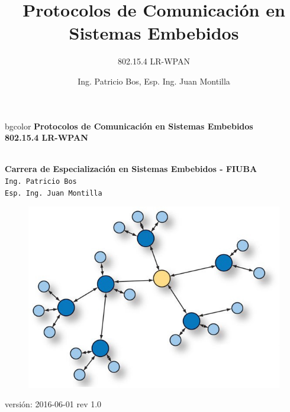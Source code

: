 \documentclass[aspectratio=169, handout]{beamer}
\title[802.15.4 LR-WPAN]{Protocolos de Comunicación en Sistemas Embebidos}
\subtitle{802.15.4 LR-WPAN}
\author[]{Ing. Patricio Bos, Esp. Ing. Juan Montilla}
\institute[CESE-FIUBA]{Carrera de Especialización en Sistemas Embebidos - FIUBA}
\date{}
\begin{document}

%



\begingroup
\makeatletter
\setlength{\hoffset}{-.5\beamer@sidebarwidth}
\makeatother
\begin{frame}
\begin{center}
\hfill
    \begin{beamercolorbox}[center,dp=3ex,ht=10.25ex, wd=1\linewidth]{bgcolor}
        \Large\textbf{Protocolos de Comunicación en Sistemas Embebidos}\\
        \huge\textbf{802.15.4 LR-WPAN}
    \end{beamercolorbox}
\hfill\hfill
\\
\vspace{5px}
\textbf{Carrera de Especialización en Sistemas Embebidos - FIUBA}\\
\vspace{10px}
\texttt{Ing. Patricio Bos}\\
\texttt{Esp. Ing. Juan Montilla}\\

\vspace{10px}

\begin{figure}[H]
	\includegraphics[width=.3\textwidth]{./imagenes/red.jpg}
\end{figure}	  	  	
\vspace{5px}
\tiny versión: 2016-06-01 rev 1.0 

\end{center}
\end{frame}
\endgroup
\end{document}
